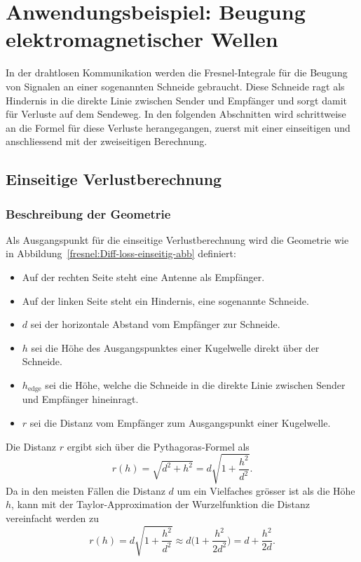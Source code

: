 %
%
%
%

\section{Anwendungsbeispiel: Beugung elektromagnetischer Wellen}

In der drahtlosen Kommunikation werden die Fresnel-Integrale für 
%
die Beugung von Signalen an einer sogenannten Schneide gebraucht.
%
Diese Schneide ragt als Hindernis in die direkte 
Linie zwischen Sender und Empfänger
%
%
und sorgt damit für Verluste auf dem Sendeweg.
%
In den folgenden Abschnitten wird schrittweise an
die Formel für diese Verluste herangegangen,
zuerst mit einer einseitigen und anschliessend
mit der zweiseitigen Berechnung.

\subsection{Einseitige Verlustberechnung}


\subsubsection{Beschreibung der Geometrie}\label{fresnel:Beispiel-Geometriebeschrieb}
Als Ausgangspunkt für die einseitige Verlustberechnung wird die Geometrie wie in 
Abbildung~\ref{fresnel:Diff-loss-einseitig-abb} definiert:
\begin{itemize}
    \item
    Auf der rechten Seite steht eine Antenne als Empfänger.
%
    \item
    Auf der linken Seite steht ein Hindernis, eine sogenannte Schneide.
    \item 
    $d$ sei der horizontale Abstand vom Empfänger zur Schneide.
    \item 
    $h$ sei die Höhe des Ausgangspunktes einer Kugelwelle direkt über der Schneide.
    \item
    $h_{\text{edge}}$ sei die Höhe, welche die Schneide in die direkte Linie zwischen Sender und Empfänger hineinragt.
    \item 
    $r$ sei die Distanz vom Empfänger zum Ausgangspunkt einer Kugelwelle.
%
\end{itemize}
Die Distanz $r$ ergibt sich über die Pythagoras-Formel als
%
\[
r(h) 
= 
\sqrt{d^2 + h^2}
=
d \sqrt{1 + \frac{h^2}{d^2}}.
\]
Da in den meisten Fällen die Distanz $d$
um ein Vielfaches grösser ist als die Höhe $h$,
kann mit der Taylor-Approximation der Wurzelfunktion die Distanz vereinfacht werden zu
%
\begin{equation}
    r(h)
    =
    d \sqrt{1 + \frac{h^2}{d^2}}
    \approx
    d \biggl( 1 + \frac{h^2}{2d^2} \biggr)
    =
    d + \frac{h^2}{2d}.
    \label{fresnel:Distanz-R-Taylor-einseitig}
\end{equation}


